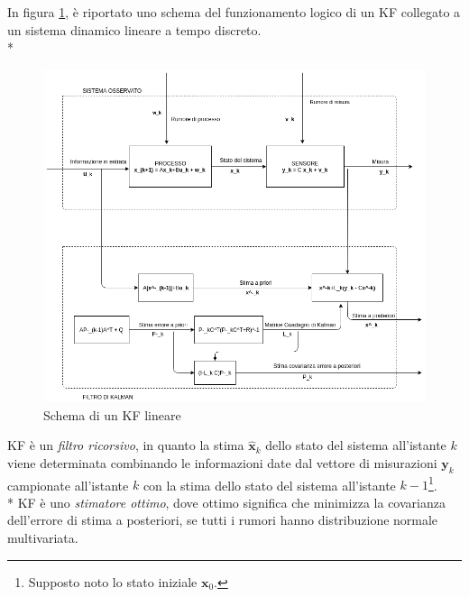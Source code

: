 In figura \ref{fig:kf}, \`e riportato uno schema del funzionamento logico di un KF collegato a un sistema dinamico lineare a tempo discreto.\\*
\begin{figure}[h]
	\centering
	\includegraphics[width=\linewidth]{img/kalman}
	\caption{Schema di un KF lineare}
	\label{fig:kf}
\end{figure}
KF \`e un \emph{filtro ricorsivo}, in quanto la stima $\hat{\mathbf{x}}_k$ dello stato del sistema all'istante $k$ viene determinata combinando le informazioni date dal vettore di misurazioni $\mathbf y_k$ campionate all'istante $k$ con la stima dello stato del sistema all'istante $k-1$\footnote{Supposto noto lo stato iniziale $\mathbf x_0$.}.\\*
KF \`e uno \emph{stimatore ottimo}, dove ottimo significa che minimizza la covarianza dell'errore di stima a posteriori, se tutti i rumori hanno distribuzione normale multivariata. \cite{kfbook}
\newpage
